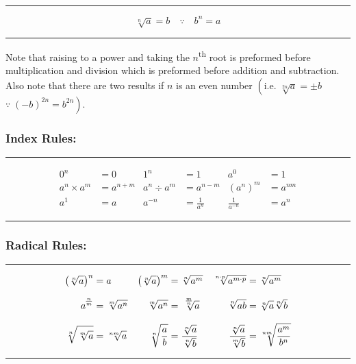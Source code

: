 \documentclass[a5paper,9pt]{book}
\theoremstyle{definition}
\newcommand{\txtlinesur}[1]{%
    \vspace*{\baselineskip}

    \hrule%

    \vspace*{\medskipamount}

    #1

    \vspace*{\medskipamount}

    \hrule%

    \vspace*{\baselineskip}
}
\newcommand{\eqlinesur}[1]{%
    \vspace*{\baselineskip}

    \hrule%

    \vspace*{\medskipamount}

    #1

    \vspace*{\medskipamount-0.5\belowdisplayskip}

    \hrule%

    \vspace*{\baselineskip}
}
\begin{document}
                \pagebreak

                \vspace*{-\baselineskip}

                \txtlinesur{%
                    \begin{equation*}
                        \sqrt[n]{a} = b \quad\because\quad b^n = a
                    \end{equation*}
                }
                
                Note that raising to a power and taking the $n$\textsuperscript{th} root is preformed
                before multiplication and division which is preformed before addition and
                subtraction. Also note that there are two results if $n$ is an even number
                $\left(\text{i.e.\ }\sqrt[2n]{a} = \pm b\right.$ $\left.\because\; (-b)^{2n}=b^{2n}\right)$.

                \subsubsection{Index Rules:}

                \eqlinesur{%
                    \begin{align*}
                        0^n &= 0 & 1^n &= 1 & a^0 &= 1\\[7.5pt]
                        a^n\times a^m &= a^{n+m} & a^n\div a^m &= a^{n-m} & {\left(a^n\right)}^m &= a^{nm} \\[7.5pt]
                        a^1 &= a & a^{-n} &= \frac{1}{a^n} & \frac{1}{a^{-n}} &= a^n
                    \end{align*}
                }

                \subsubsection{Radical Rules:}

                \eqlinesur{%
                    \begin{align*}
                        {\left(\sqrt[n]{a}\right)}^n &= a & {\left(\sqrt[n]{a}\right)}^m &= \sqrt[n]{a^m} & \sqrt[\uproot{1}n\cdot p]{a^{m\cdot p}} &= \sqrt[n]{a^m} \\[7.5pt]
                        a\strut^{\hspace{-1pt}\frac{n}{m}} &= \sqrt[m]{a^n} & \sqrt[m]{a^n} &= \sqrt[\leftroot{-2}\uproot{5}{\frac{m}{n}}]{a} & \sqrt[n]{ab} &= \sqrt[n]{a}\sqrt[n]{b}\\[7.5pt]
                        \sqrt[n]{\sqrt[m]{a}} &= \sqrt[nm]{a} & \sqrt[n]{\frac{a}{b}} &= \frac{\sqrt[n]{a}}{\sqrt[n]{b}} & \frac{\sqrt[n]{a}}{\sqrt[m]{b}} &= \sqrt[nm]{\frac{a^m}{b^n}}
                    \end{align*}
                }
\end{document}
